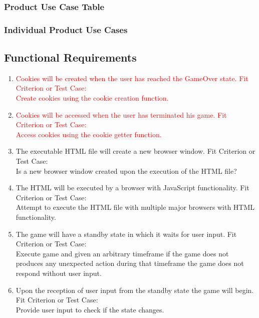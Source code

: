 \documentclass[11pt, oneside]{article}   	%
\begin{document}
\subsubsection{Product Use Case Table}



\subsubsection{Individual Product Use Cases}



\subsection{Functional Requirements}
\begin{enumerate}

\item
\textcolor{red}{Cookies will be created when the user has reached the GameOver state.}
\subitem
\textcolor{red}{Fit Criterion or Test Case:} \\
\textcolor{red}{Create cookies using the cookie creation function.}

\item
\textcolor{red}{Cookies will be accessed when the user has terminated his game.}
\subitem
\textcolor{red}{Fit Criterion or Test Case:} \\
\textcolor{red}{Access cookies using the cookie getter function.}

\item
The executable HTML file will create a new browser window.
\subitem
Fit Criterion or Test Case: \\
Is a new browser window created upon the execution of the HTML file?

\item
The HTML will be executed by a browser with JavaScript functionality.
\subitem
Fit Criterion or Test Case: \\
Attempt to execute the HTML file with multiple major browsers with HTML functionality.

\item
The game will have a standby state in which it waits for user input.
\subitem
Fit Criterion or Test Case: \\
Execute game and given an arbitrary timeframe if the game does not produces any unexpected action during that timeframe the game does not respond without user input.

\item
Upon the reception of user input from the standby state the game will begin.
\subitem
Fit Criterion or Test Case: \\
Provide user input to check if the state changes.


\end{enumerate}
\end{document}
